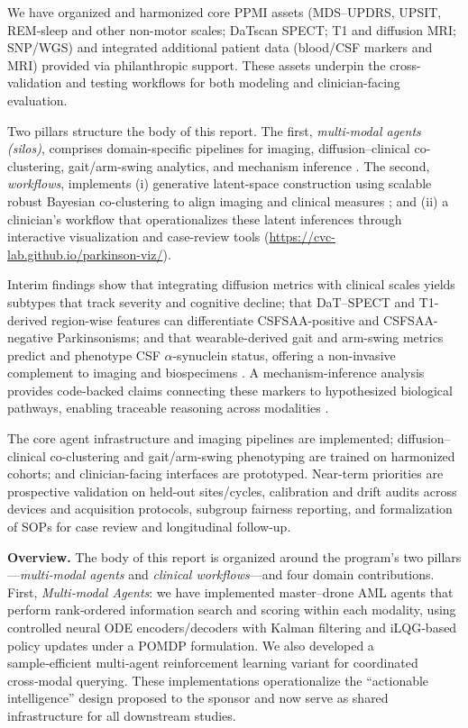 \documentclass[11pt]{article}
\begin{document}
We have organized and harmonized core PPMI assets (MDS--UPDRS, UPSIT, REM-sleep and other non-motor scales; DaTscan SPECT; T1 and diffusion MRI; SNP/WGS) and integrated additional patient data (blood/CSF markers and MRI) provided via philanthropic support. These assets underpin the cross-validation and testing workflows for both modeling and clinician-facing evaluation.

Two pillars structure the body of this report. The first, \emph{multi-modal agents (silos)}, comprises domain-specific pipelines for imaging, diffusion--clinical co-clustering, gait/arm-swing analytics, and mechanism inference \cite{dominick2025brain,vinod2025compositional,khalil2025multimodal,tirhekar2025comprehensive}. The second, \emph{workflows}, implements (i) generative latent-space construction using scalable robust Bayesian co-clustering to align imaging and clinical measures \cite{vinod2025scalable,vinod2025compositional}; and (ii) a clinician’s workflow that operationalizes these latent inferences through interactive visualization and case-review tools (\url{https://cvc-lab.github.io/parkinson-viz/}).

Interim findings show that integrating diffusion metrics with clinical scales yields subtypes that track severity and cognitive decline; that DaT--SPECT and T1-derived region-wise features can differentiate CSFSAA-positive and CSFSAA-negative Parkinsonisms; and that wearable-derived gait and arm-swing metrics predict and phenotype CSF {$\alpha$}-synuclein status, offering a non-invasive complement to imaging and biospecimens \cite{dominick2025brain,vinod2025compositional,khalil2025multimodal}. A mechanism-inference analysis provides code-backed claims connecting these markers to hypothesized biological pathways, enabling traceable reasoning across modalities \cite{tirhekar2025comprehensive}.

The core agent infrastructure and imaging pipelines are implemented; diffusion--clinical co-clustering and gait/arm-swing phenotyping are trained on harmonized cohorts; and clinician-facing interfaces are prototyped. Near-term priorities are prospective validation on held-out sites/cycles, calibration and drift audits across devices and acquisition protocols, subgroup fairness reporting, and formalization of SOPs for case review and longitudinal follow-up.


\textbf{Overview.} The body of this report is organized around the program’s two pillars—\emph{multi‑modal agents} and \emph{clinical workflows}—and four domain contributions. First, \emph{Multi‑modal Agents}: we have implemented master–drone AML agents that perform rank‑ordered information search and scoring within each modality, using controlled neural ODE encoders/decoders with Kalman filtering and iLQG‑based policy updates under a POMDP formulation. We also developed a sample‑efficient multi‑agent reinforcement learning variant for coordinated cross‑modal querying. These implementations operationalize the “actionable intelligence” design proposed to the sponsor and now serve as shared infrastructure for all downstream studies.
\end{document}
